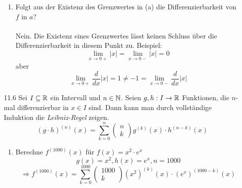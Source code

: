 \documentclass{HM}
\begin{document}
\begin{enumerate}
\begin{enumerate}
	\item Folgt aus der Existenz des Grenzwertes in (a) die Differenzierbarkeit von $f$ in $a$?\\\\
	Nein. Die Existenz eines Grenzwertes lässt keinen Schluss über die Differenzierbarkeit in diesem Punkt zu. Beispiel:\\
	$$\lim\limits_{x\to 0+}|x|=\lim\limits_{x\to 0-}|x|=0$$
	aber $$\lim\limits_{x\to 0+}\frac{d}{dx}|x|=1\not=-1=\lim\limits_{x\to 0-}\frac{d}{dx}|x|$$
\end{enumerate}
\newpage
\item [11.6] Sei $I\subseteq\mathbb{R}$ ein Intervall und $n\in\mathbb{N}$. Seien $g,h:I\to\mathbb{R}$ Funktionen, die $n$-mal differenzierbar in $x\in I$ sind. Dann kann man durch vollständige Induktion die \textit{Leibniz-Regel} zeigen.
$$(g\cdot h)^{(n)}(x)=\sum\limits_{k=0}^n\begin{pmatrix}
n\\k
\end{pmatrix}g^{(k)}(x)\cdot h^{(n-k)}(x)$$
\begin{enumerate}
	\item Berechne $f^{(1000)}(x)$ für $f(x)=x^2\cdot e^x$\\
	$$g(x)=x^2, h(x)=e^x, n=1000$$
	$$\Rightarrow f^{(1000)}(x)=\sum\limits_{k=0}^1000\begin{pmatrix}
1000\\k
\end{pmatrix}(x^2)^{(k)}(x)\cdot (e^x)^{(1000-k)}(x)$$
\end{enumerate}
\end{enumerate}
\end{document}
